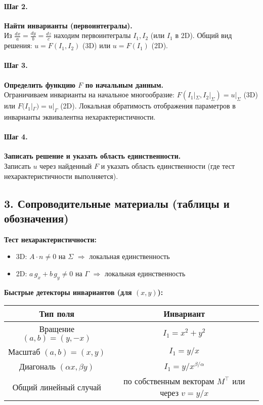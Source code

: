 \paragraph{Шаг 2.} \textbf{Найти инварианты (первоинтегралы).}\\
Из \(\tfrac{dx}{a}=\tfrac{dy}{b}=\tfrac{dz}{c}\) находим первоинтегралы \(I_1,I_2\) (или \(I_1\) в 2D).
Общий вид решения: \(u=F(I_1,I_2)\) (3D) или \(u=F(I_1)\) (2D).

\paragraph{Шаг 3.} \textbf{Определить функцию \(F\) по начальным данным.}\\
Ограничиваем инварианты на начальное многообразие:
\(F(I_1|_{\Sigma},I_2|_{\Sigma})=u|_{\Sigma}\) (3D) или \(F(I_1|_{\Gamma})=u|_{\Gamma}\) (2D).
Локальная обратимость отображения параметров в инварианты эквивалентна нехарактеристичности.

\paragraph{Шаг 4.} \textbf{Записать решение и указать область единственности.}\\
Записать \(u\) через найденный \(F\) и указать область единственности (где тест нехарактеристичности выполняется).

\subsection*{3. Сопроводительные материалы (таблицы и обозначения)}

\textbf{Тест нехарактеристичности:}
\begin{itemize}
\item 3D: \(A\cdot n\neq0\) на \(\Sigma\) \(\Rightarrow\) локальная единственность
\item 2D: \(a\,g_x+b\,g_y\neq0\) на \(\Gamma\) \(\Rightarrow\) локальная единственность
\end{itemize}

\textbf{Быстрые детекторы инвариантов (для \((x,y)\)):}
\begin{center}
\begin{tabular}{|c|c|}
\hline
\textbf{Тип поля} & \textbf{Инвариант} \\ \hline
Вращение \((a,b)=(y,-x)\) & \(I_1=x^2+y^2\) \\ \hline
Масштаб \((a,b)=(x,y)\) & \(I_1=y/x\) \\ \hline
Диагональ \((\alpha x,\beta y)\) & \(I_1=y/x^{\beta/\alpha}\) \\ \hline
Общий линейный случай & по собственным векторам \(M^\top\) или через \(v=y/x\) \\ \hline
\end{tabular}
\end{center}

